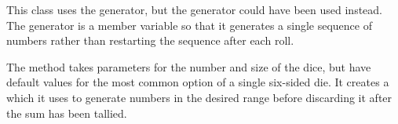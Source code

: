 This class uses the  generator, but the  generator could have been used instead.
The generator is a member variable so that it generates a single sequence of numbers rather than restarting the sequence after each roll.

The  method takes parameters for the number and size of the dice, but have default values for the most common option of a single six-sided die.
It creates a  which it uses to generate numbers in the desired range before discarding it after the sum has been tallied.





